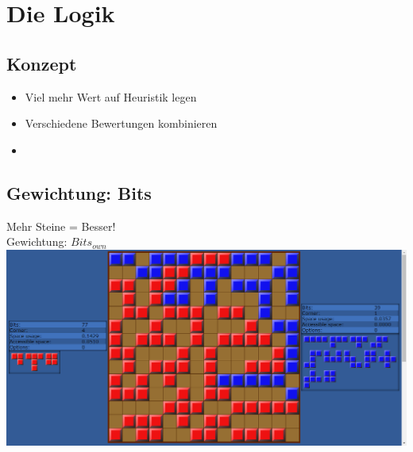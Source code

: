 \documentclass[12pt, draft]{beamer}
\begin{document}
\section{Die Logik}
\subsection{Konzept}
\begin{frame}
	\begin{itemize}
		\item<1-> Viel mehr Wert auf Heuristik legen
		\item<2-> Verschiedene Bewertungen kombinieren
		\item<3-> %
    \end{itemize}
\end{frame}

\subsection{Gewichtung: Bits}
\begin{frame}
	Mehr Steine = Besser!\\
	\pause
	Gewichtung: $Bits_{own}$\\
	\pause
	\includegraphics[width=\linewidth]{media/wgh1.png}
\end{frame}
\end{document}
